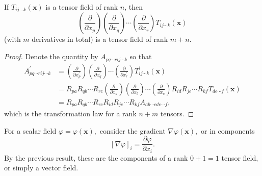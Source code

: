 \begin{proposition}
    If $T_{i j \ldots k}(\mathbf{x})$ is a tensor field of rank $n$, then
    \[
    \left(\frac{\partial}{\partial x_{p}}\right)\left(\frac{\partial}{\partial x_{q}}\right) \cdots\left(\frac{\partial}{\partial x_{r}}\right) T_{i j \cdots k}(\mathbf{x})
    \]
    (with $m$ derivatives in total) is a tensor field of rank $m+n$.
\end{proposition}
\begin{proof}
    Denote the quantity by $A_{p q \cdots r i j \cdots k}$ so that
    \[
    \begin{aligned}
    A_{p q \cdots r i j \cdots k}^{\prime} &=\left(\frac{\partial}{\partial x_{p}^{\prime}}\right)\left(\frac{\partial}{\partial x_{q}^{\prime}}\right) \cdots\left(\frac{\partial}{\partial x_{r}^{\prime}}\right) T_{i j \cdots k}^{\prime}(\mathbf{x}) \\
    &=R_{p a} R_{q b} \cdots R_{r c}\left(\frac{\partial}{\partial x_{a}}\right)\left(\frac{\partial}{\partial x_{b}}\right) \cdots\left(\frac{\partial}{\partial x_{c}}\right) R_{i d} R_{j e} \cdots R_{k f} T_{d e \cdots f}(\mathbf{x}) \\
    &=R_{p a} R_{q b} \cdots R_{r c} R_{i d} R_{j e} \cdots R_{k f} A_{a b \cdots c d e \cdots f},
    \end{aligned}
    \]
    which is the transformation law for a rank $n+m$ tensors.
\end{proof}
\begin{example}
    For a scalar field $\varphi=\varphi(\mathbf{x}),$ consider the gradient $\nabla \varphi(\mathbf{x}),$ or in components
    \[
    [\nabla \varphi]_{i}=\frac{\partial \varphi}{\partial x_{i}}.
    \]
    By the previous result, these are the components of a rank $0+1=1$ tensor field, or simply a vector field.
\end{example}

